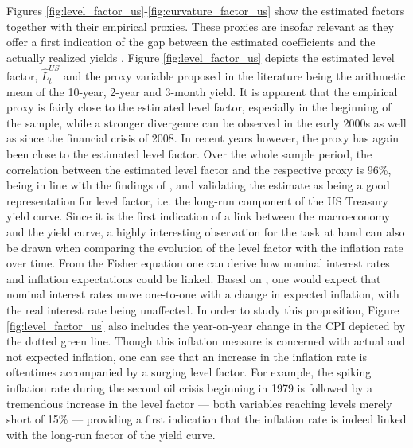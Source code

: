Figures \ref{fig:level_factor_us}-\ref{fig:curvature_factor_us} show the estimated factors together with their empirical proxies. 
These proxies are insofar relevant as they offer a first indication of the gap between the estimated coefficients and the actually realized yields \citep{kanjilal2011macroeconomic}.
Figure \ref{fig:level_factor_us} depicts the estimated level factor, $\hat{L}^{US}_{t}$ and the proxy variable proposed in the literature being the arithmetic mean of the 10-year, 2-year and 3-month yield. 
It is apparent that the empirical proxy is fairly close to the estimated level factor, especially in the beginning of the sample, while a stronger divergence can be observed in the early 2000s as well as since the financial crisis of 2008.
In recent years however, the proxy has again been close to the estimated level factor. 
Over the whole sample period, the correlation between the estimated level factor and the respective proxy is 96\%, being in line with the findings of \citet{diebold2006macroeconomy}, and validating the estimate as being a good representation for level factor, i.e. the long-run component of the US Treasury yield curve. 
Since it is the first indication of a link between the macroeconomy and the yield curve, a highly interesting observation for the task at hand can also be drawn when comparing the evolution of the level factor with the inflation rate over time. 
From the Fisher equation one can derive how nominal interest rates and inflation expectations could be linked. 
Based on \citet{fisher1930theory}, one would expect that nominal interest rates move one-to-one with a change in expected inflation, with the real interest rate being unaffected. 
In order to study this proposition, Figure \ref{fig:level_factor_us} also includes the year-on-year change in the CPI depicted by the dotted green line.
Though this inflation measure is concerned with actual and not expected inflation, one can see that an increase in the inflation rate is oftentimes accompanied by a surging level factor. For example, the spiking inflation rate during the second oil crisis beginning in 1979 is followed by a tremendous increase in the level factor --- both variables reaching levels merely short of 15\% --- providing a first indication that the inflation rate is indeed linked with the long-run factor of the yield curve. 
